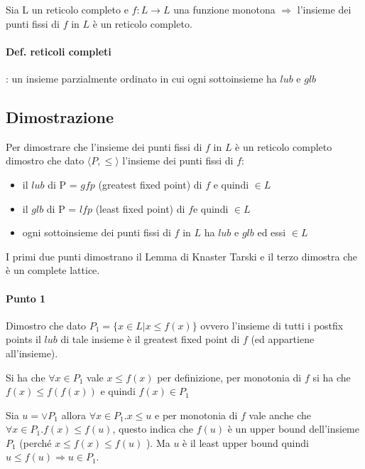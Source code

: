 \documentclass{article}
\begin{document}
Sia L un reticolo completo e $f:L \rightarrow L$ una funzione monotona $\Rightarrow$ l'insieme dei punti fissi di $f$ in $L$ è un reticolo completo.

\paragraph{Def. reticoli completi}: un insieme parzialmente ordinato in cui ogni sottoinsieme ha $lub$ e $glb$

\subsection{Dimostrazione}
Per dimostrare che l'insieme dei punti fissi di $f$ in $L$ è un reticolo completo dimostro che dato $\langle P,\leq\rangle$ l'insieme dei punti fissi di $f$:
\begin{itemize}
    \item il $lub$ di P = $gfp$ (greatest fixed point) di $f$ e quindi $\in L$
    \item il $glb$ di P = $lfp$ (least fixed point) di $f$e quindi $\in L$
    \item ogni sottoinsieme dei punti fissi di $f$ in $L$ ha $lub$ e $glb$ ed essi $\in L$
\end{itemize}

I primi due punti dimostrano il Lemma di Knaster Tarski e il terzo dimostra che è un complete lattice.

\paragraph{Punto 1}

Dimostro che dato $P_{1}=\{x \in L | x  \leq f(x)\}$ ovvero l'insieme di tutti i postfix points il $lub$ di tale insieme è il greatest fixed point di $f$ (ed appartiene all'insieme).

Si ha che $\forall x \in P_{1}$ vale $x \leq f(x)$ per definizione, per monotonia di $f$ si ha che $f(x)\leq f(f(x))$ e quindi $f(x) \in P_{1}$ 

Sia $u=\lor P_{1}$ allora $\forall x \in P_{1}. x \leq u$ e per monotonia di $f$ vale anche che $\forall x \in P_{1}.f(x)\leq f(u)$, questo indica che $f(u)$ è un upper bound dell'insieme $P_{1}$ (perché $x \leq f(x) \leq f(u)$ ). Ma $u$ è il least upper bound quindi $u \leq f(u) \Rightarrow u \in P_{1}$.
\end{document}
